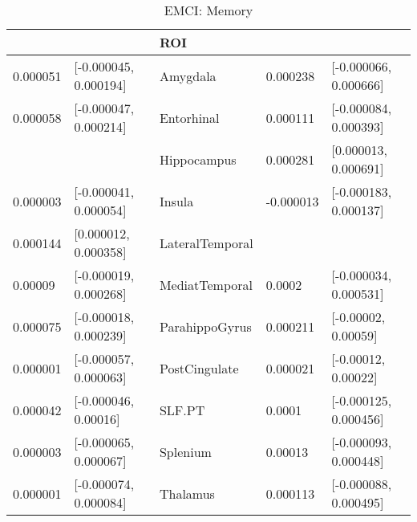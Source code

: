 \documentclass{article}
\begin{document}
\begin{table}[H]
\centering
\caption{EMCI: Memory} 
\begin{tabular}{lllll}
  \toprule
\cellcolor{red!30}{B2} & \cellcolor{red!30}{CI} & ROI & \cellcolor{blue!30}{B3} & \cellcolor{blue!30}{CI} \\ 
  \midrule
0.000051 & [-0.000045, 0.000194] & Amygdala & 0.000238 & [-0.000066, 0.000666] \\ 
  0.000058 & [-0.000047, 0.000214] & Entorhinal & 0.000111 & [-0.000084, 0.000393] \\ 
   \rowcolor{blue!30}\cellcolor{white}{0.000043} & \cellcolor{white}{[-0.000068, 0.000174]} & Hippocampus & 0.000281 & [0.000013, 0.000691] \\ 
  0.000003 & [-0.000041, 0.000054] & Insula & -0.000013 & [-0.000183, 0.000137] \\ 
   \rowcolor{red!30}0.000144 & [0.000012, 0.000358] & LateralTemporal & \cellcolor{white}{0.000149} & \cellcolor{white}{[-0.000214, 0.000518]} \\ 
  0.00009 & [-0.000019, 0.000268] & MediatTemporal & 0.0002 & [-0.000034, 0.000531] \\ 
  0.000075 & [-0.000018, 0.000239] & ParahippoGyrus & 0.000211 & [-0.00002, 0.00059] \\ 
  0.000001 & [-0.000057, 0.000063] & PostCingulate & 0.000021 & [-0.00012, 0.00022] \\ 
  0.000042 & [-0.000046, 0.00016] & SLF.PT & 0.0001 & [-0.000125, 0.000456] \\ 
  0.000003 & [-0.000065, 0.000067] & Splenium & 0.00013 & [-0.000093, 0.000448] \\ 
  0.000001 & [-0.000074, 0.000084] & Thalamus & 0.000113 & [-0.000088, 0.000495] \\ 
   \bottomrule
\end{tabular}
\end{table}
\end{document}
